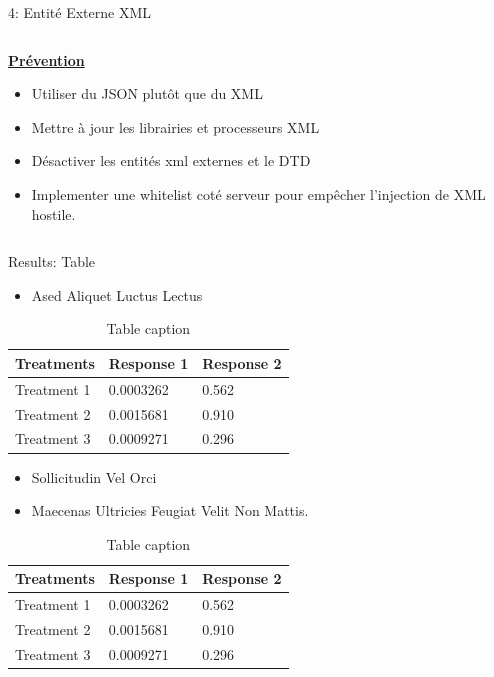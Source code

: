 \documentclass[final,hyperref={pdfpagelabels=false}]{beamer}
\begin{document}
\begin{frame}[t]
\begin{columns}[t]
\begin{column}{.465\textwidth}
\begin{block}{4: Entité Externe XML}
\begin{columns}[T]
\begin{column}{0.495\textwidth}
				\vfill
				\uline{\textbf{Prévention}}
				\begin{itemize}
					\item Utiliser du JSON plutôt que du XML
					\item Mettre à jour les librairies et processeurs XML
					\item Désactiver les entités xml externes et le DTD
					\item Implementer une whitelist coté serveur pour empêcher
						l'injection de XML hostile.
				\end{itemize}
			\end{column}
		\end{columns}
	\end{block}


\begin{block}{Results: Table}

\begin{itemize}
\item Ased Aliquet Luctus Lectus
\end{itemize}

\begin{table}
\begin{tabular}{l l l}
\toprule
\textbf{Treatments} & \textbf{Response 1} & \textbf{Response 2}\\
\midrule
Treatment 1 & 0.0003262 & 0.562 \\
Treatment 2 & 0.0015681 & 0.910 \\
Treatment 3 & 0.0009271 & 0.296 \\
\bottomrule
\end{tabular}
\caption{Table caption}
\end{table}

\begin{itemize}
\item Sollicitudin Vel Orci
\item Maecenas Ultricies Feugiat Velit Non Mattis.
\end{itemize}

\begin{table}
\begin{tabular}{l l l}
\toprule
\textbf{Treatments} & \textbf{Response 1} & \textbf{Response 2}\\
\midrule
Treatment 1 & 0.0003262 & 0.562 \\
Treatment 2 & 0.0015681 & 0.910 \\
Treatment 3 & 0.0009271 & 0.296 \\
\bottomrule
\end{tabular}
\caption{Table caption}
\end{table}
     

\end{block}
\end{column}
\end{columns}
\end{frame}
\end{document}
